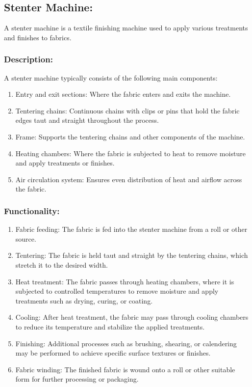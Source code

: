 \subsection{Stenter Machine:}


A stenter machine is a textile finishing machine used to apply various
treatments and finishes to fabrics.


\subsubsection{Description:}


A stenter machine typically consists of the following main components:


\begin{enumerate}
\item
  Entry and exit sections: Where the fabric enters and exits the
  machine.
\item
  Tentering chains: Continuous chains with clips or pins that hold the
  fabric edges taut and straight throughout the process.
\item
  Frame: Supports the tentering chains and other components of the
  machine.
\item
  Heating chambers: Where the fabric is subjected to heat to remove
  moisture and apply treatments or finishes.
\item
  Air circulation system: Ensures even distribution of heat and airflow
  across the fabric.
\end{enumerate}

\subsubsection{Functionality:}

\begin{enumerate}
\item
  Fabric feeding: The fabric is fed into the stenter machine from a roll
  or other source.
\item
  Tentering: The fabric is held taut and straight by the tentering
  chains, which stretch it to the desired width.
\item
  Heat treatment: The fabric passes through heating chambers, where it
  is subjected to controlled temperatures to remove moisture and apply
  treatments such as drying, curing, or coating.
\item
  Cooling: After heat treatment, the fabric may pass through cooling
  chambers to reduce its temperature and stabilize the applied
  treatments.
\item
  Finishing: Additional processes such as brushing, shearing, or
  calendering may be performed to achieve specific surface textures or
  finishes.
\item
  Fabric winding: The finished fabric is wound onto a roll or other
  suitable form for further processing or packaging.
\end{enumerate}

